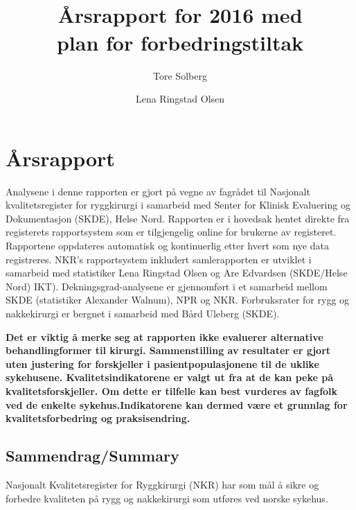\documentclass[norsk, a4paper, twocolumn]{report}
\title{\registernavn \\ \textbf{Årsrapport for 2016 med \\
plan for forbedringstiltak}}
\author[1]{Tore Solberg}
\author[2]{Lena Ringstad Olsen}
\affil[1]{Universitetssykehuset Nord Norge (UNN)}
\affil[2]{SKDE}
\date{\parbox{\linewidth}{\centering%
  \today\endgraf\bigskip
  \begin{small}
  På vegne av fagrådet:\endgraf\medskip
  Øystein P Nygaard, St. Olav, HM (fagrådsleder)\\
  Jens Ivar Brox, OUS, HSØ\\
  Ivar Austevoll, HUS, HV\\
  Christian Hellum, OUS, HSØ\\
  Greger Lønne, NOP, HSØ\\
  Frode Kolstad, NNKF, HSØ\\
  Stein Andersen (Adm. leder, Ryggforeningen)\\
  Tore K Solberg, UNN, HN (faglig leder)\endgraf
  \end{small}
}}
\begin{document}
\maketitle

\onecolumn





\tableofcontents


\part{Årsrapport}\label{par:rap}
Analysene i denne rapporten er gjort på vegne av fagrådet til Nasjonalt
kvalitetsregister for ryggkirurgi i samarbeid med Senter for Klinisk Evaluering og
Dokumentasjon (SKDE), Helse Nord. Rapporten er i hovedsak hentet direkte fra
registerets rapportsystem som er tilgjengelig online for brukerne av registeret.
Rapportene oppdateres automatisk og kontinuerlig etter hvert som nye data
registreres. NKR’s rapportsystem inkludert samlerapporten er utviklet i samarbeid
med statistiker Lena Ringstad Olsen og Are Edvardsen (SKDE/Helse Nord) IKT).
 Dekningsgrad-analysene er gjennomført i et samarbeid mellom SKDE (statistiker Alexander Walnum), NPR og NKR. Forbruksrater for rygg og nakkekirurgi er bergnet i samarbeid med Bård Uleberg (SKDE).



\textbf{Det er viktig å merke seg at rapporten ikke evaluerer alternative behandlingformer til kirurgi. Sammenstilling av resultater er gjort uten justering for forskjeller i pasientpopulasjonene til de uklike sykehusene. Kvalitetsindikatorene er valgt ut fra at de kan peke på kvalitetsforskjeller. Om dette er tilfelle kan best vurderes av fagfolk ved de enkelte sykehus.Indikatorene kan dermed være et grunnlag for kvalitetsforbedring og  praksisendring.} 

\thispagestyle{empty}



\chapter{Sammendrag/Summary}


Nasjonalt Kvalitetsregister for Ryggkirurgi (NKR) har som mål å sikre og forbedre 
kvaliteten på rygg og nakkekirurgi som utføres ved norske sykehus.
\end{document}
